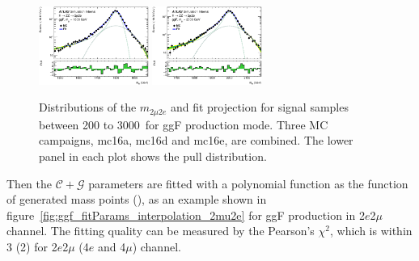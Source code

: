 \begin{figure}[htbp]
    \includegraphics[width=0.32\textwidth]{figures/HMHZZ/signal/NWA//ggf_mass_signal_1800_H4l_2mu2e.eps}
    \includegraphics[width=0.32\textwidth]{figures/HMHZZ/signal/NWA//ggf_mass_signal_2000_H4l_2mu2e.eps}
    \caption{Distributions of the $m_{2\mu 2e}$ and fit projection for signal samples between 200 to 3000~\gev for ggF production mode. 
    Three MC campaigns, mc16a, mc16d and mc16e, are combined. 
    The lower panel in each plot shows the pull distribution.}
    \label{fig:ggf_mass_signalParam_2mu2e}
\end{figure}

Then the $\mathcal{C}+\mathcal{G}$ parameters are fitted with a polynomial function as the function of generated mass points (\mH), as an example shown in figure~\ref{fig:ggf_fitParams_interpolation_2mu2e} for ggF production in 2$e$2$\mu$ channel.
The fitting quality can be measured by the Pearson's $\chi^2$, which is within 3 (2) for 2$e$2$\mu$ (4$e$ and 4$\mu$) channel.

